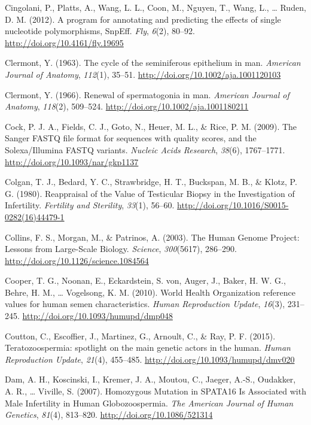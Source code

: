 \documentclass[12pt,twoside]{reedthesis}
\theoremstyle{definition}
\theoremstyle{definition}
\theoremstyle{remark}
\begin{document}
  \hypertarget{ref-Cingolani2012}{}
  Cingolani, P., Platts, A., Wang, L. L., Coon, M., Nguyen, T., Wang, L.,
  \ldots{} Ruden, D. M. (2012). A program for annotating and predicting
  the effects of single nucleotide polymorphisms, SnpEff. \emph{Fly},
  \emph{6}(2), 80--92. \url{http://doi.org/10.4161/fly.19695}
  
  \hypertarget{ref-Clermont1963}{}
  Clermont, Y. (1963). The cycle of the seminiferous epithelium in man.
  \emph{American Journal of Anatomy}, \emph{112}(1), 35--51.
  \url{http://doi.org/10.1002/aja.1001120103}
  
  \hypertarget{ref-Clermont1966}{}
  Clermont, Y. (1966). Renewal of spermatogonia in man. \emph{American
  Journal of Anatomy}, \emph{118}(2), 509--524.
  \url{http://doi.org/10.1002/aja.1001180211}
  
  \hypertarget{ref-Cock2009}{}
  Cock, P. J. A., Fields, C. J., Goto, N., Heuer, M. L., \& Rice, P. M.
  (2009). The Sanger FASTQ file format for sequences with quality scores,
  and the Solexa/Illumina FASTQ variants. \emph{Nucleic Acids Research},
  \emph{38}(6), 1767--1771. \url{http://doi.org/10.1093/nar/gkp1137}
  
  \hypertarget{ref-Colgan1980}{}
  Colgan, T. J., Bedard, Y. C., Strawbridge, H. T., Buckspan, M. B., \&
  Klotz, P. G. (1980). Reappraisal of the Value of Testicular Biopsy in
  the Investigation of Infertility. \emph{Fertility and Sterility},
  \emph{33}(1), 56--60. \url{http://doi.org/10.1016/S0015-0282(16)44479-1}
  
  \hypertarget{ref-Collins2003}{}
  Collins, F. S., Morgan, M., \& Patrinos, A. (2003). The Human Genome
  Project: Lessons from Large-Scale Biology. \emph{Science},
  \emph{300}(5617), 286--290. \url{http://doi.org/10.1126/science.1084564}
  
  \hypertarget{ref-Cooper2010}{}
  Cooper, T. G., Noonan, E., Eckardstein, S. von, Auger, J., Baker, H. W.
  G., Behre, H. M., \ldots{} Vogelsong, K. M. (2010). World Health
  Organization reference values for human semen characteristics.
  \emph{Human Reproduction Update}, \emph{16}(3), 231--245.
  \url{http://doi.org/10.1093/humupd/dmp048}
  
  \hypertarget{ref-Coutton2015}{}
  Coutton, C., Escoffier, J., Martinez, G., Arnoult, C., \& Ray, P. F.
  (2015). Teratozoospermia: spotlight on the main genetic actors in the
  human. \emph{Human Reproduction Update}, \emph{21}(4), 455--485.
  \url{http://doi.org/10.1093/humupd/dmv020}
  
  \hypertarget{ref-Dam2007a}{}
  Dam, A. H., Koscinski, I., Kremer, J. A., Moutou, C., Jaeger, A.-S.,
  Oudakker, A. R., \ldots{} Viville, S. (2007). Homozygous Mutation in
  SPATA16 Is Associated with Male Infertility in Human Globozoospermia.
  \emph{The American Journal of Human Genetics}, \emph{81}(4), 813--820.
  \url{http://doi.org/10.1086/521314}
  
\end{document}
